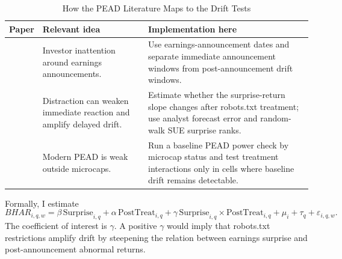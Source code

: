 \documentclass[11pt]{article}
\begin{document}
\begin{table}[!htbp]
\centering
\caption{How the PEAD Literature Maps to the Drift Tests}
\label{tab:pead_literature_map}
\begin{threeparttable}
\small
\begin{tabular}{p{3.2cm}p{4.8cm}p{6.5cm}}
\toprule
Paper & Relevant idea & Implementation here \\
\midrule
\citet{DellaVignaPollet2009} &
Investor inattention around earnings announcements. &
Use earnings-announcement dates and separate immediate announcement
windows from post-announcement drift windows. \\
\citet{HirshleiferLimTeoh2009} &
Distraction can weaken immediate reaction and amplify delayed drift. &
Estimate whether the surprise-return slope changes after robots.txt
treatment; use analyst forecast error and random-walk SUE surprise ranks. \\
\citet{Martineau2022} &
Modern PEAD is weak outside microcaps. &
Run a baseline PEAD power check by microcap status and test treatment
interactions only in cells where baseline drift remains detectable. \\
\bottomrule
\end{tabular}
\end{threeparttable}
\end{table}

Formally, I estimate
\[
    BHAR_{i,q,w}
    =
    \beta\,\text{Surprise}_{i,q}
    +
    \alpha\,\text{PostTreat}_{i,q}
    +
    \gamma\,
    \text{Surprise}_{i,q}\times \text{PostTreat}_{i,q}
    +
    \mu_i+\tau_q+\varepsilon_{i,q,w}.
\]
The coefficient of interest is \(\gamma\).  A positive \(\gamma\) would
imply that robots.txt restrictions amplify drift by steepening the
relation between earnings surprise and post-announcement abnormal returns.
\end{document}

